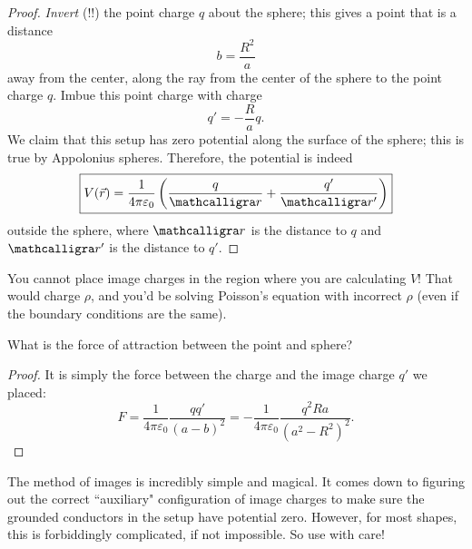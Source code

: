 \begin{proof}
\textit{Invert} (!!) the point charge $q$ about the sphere; this gives a point that is a distance 
\[b=\frac{R^2}{a}\]
away from the center, along the ray from the center of the sphere to the point charge $q$. Imbue this point charge with charge
\[q'=-\frac{R}{a}q.\]
We claim that this setup has zero potential along the surface of the sphere; this is true by Appolonius spheres. Therefore, the potential is indeed
\[\boxed{V(\vec{r})=\frac{1}{4\pi\varepsilon_0}\left(\frac{q}{\scr}+\frac{q'}{\scr'}\right)}\]
outside the sphere, where $\scr$ is the distance to $q$ and $\scr'$ is the distance to $q'$.
\end{proof}

\begin{remark}
You cannot place image charges in the region where you are calculating $V$! That would charge $\rho$, and you'd be solving Poisson's equation with incorrect $\rho$ (even if the boundary conditions are the same).
\end{remark}

\begin{example}
What is the force of attraction between the point and sphere?
\end{example}

\begin{proof}
It is simply the force between the charge and the image charge $q'$ we placed:
\[F=\frac{1}{4\pi\varepsilon_0}\frac{qq'}{(a-b)^2}=\boxed{-\frac{1}{4\pi\varepsilon_0}\frac{q^2Ra}{(a^2-R^2)^2}}.\]
\end{proof}

The method of images is incredibly simple and magical. It comes down to figuring out the correct ``auxiliary" configuration of image charges to make sure the grounded conductors in the setup have potential zero. However, for most shapes, this is forbiddingly complicated, if not impossible. So use with care!


